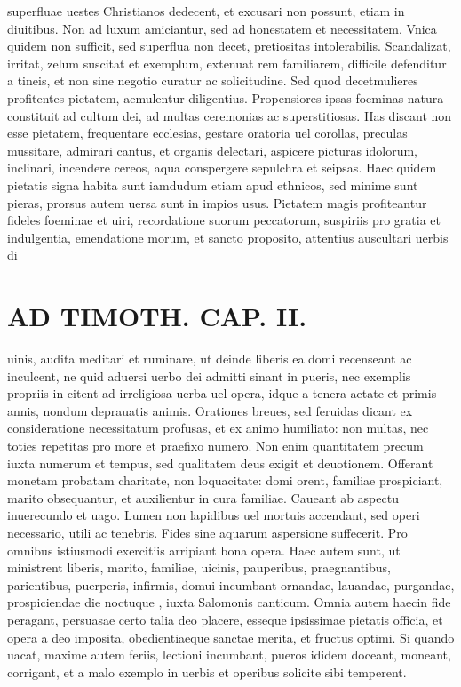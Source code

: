 \documentclass{article}
\begin{document}
\begin{pages}
superfluae uestes Christianos dedecent, et excusari non possunt, etiam in diuitibus. Non ad luxum amiciantur, sed ad honestatem et necessitatem. Vnica quidem non sufficit, sed superflua non decet, pretiositas intolerabilis. Scandalizat, irritat, zelum suscitat et exemplum, extenuat rem familiarem, difficile defenditur a tineis, et non sine negotio curatur ac solicitudine. Sed quod decetmulieres profitentes pietatem, aemulentur diligentius. Propensiores ipsas foeminas natura constituit ad cultum dei, ad multas ceremonias ac superstitiosas. Has discant non esse pietatem, frequentare ecclesias, gestare oratoria uel corollas, preculas mussitare, admirari cantus, et organis delectari, aspicere picturas idolorum, inclinari, incendere cereos, aqua conspergere sepulchra et seipsas. Haec quidem pietatis signa habita sunt iamdudum etiam apud ethnicos, sed minime sunt pieras, prorsus autem uersa sunt in impios usus. Pietatem magis profiteantur fideles foeminae et uiri, recordatione suorum peccatorum, suspiriis pro gratia et indulgentia, emendatione morum, et sancto proposito, attentius auscultari uerbis di\pend
\section*{AD TIMOTH. CAP. II. }
\marginpar{[ p.487 ]}\pstart uinis, audita meditari et ruminare, ut deinde liberis ea domi recenseant ac inculcent, ne quid aduersi uerbo dei admitti sinant in pueris, nec exemplis propriis in citent ad irreligiosa uerba uel opera, idque a tenera aetate et primis annis, nondum deprauatis animis. Orationes breues, sed feruidas dicant ex consideratione necessitatum profusas, et ex animo humiliato: non multas, nec toties repetitas pro more et praefixo numero. Non enim quantitatem precum iuxta numerum et tempus, sed qualitatem deus exigit et deuotionem. Offerant monetam probatam charitate, non loquacitate: domi orent, familiae prospiciant, marito obsequantur, et auxilientur in cura familiae. Caueant ab aspectu inuerecundo et uago. Lumen non lapidibus uel mortuis accendant, sed operi necessario, utili ac tenebris. Fides sine aquarum aspersione suffecerit. Pro omnibus istiusmodi exercitiis arripiant bona opera. Haec autem sunt, ut ministrent liberis, marito, familiae, uicinis, pauperibus, praegnantibus, parientibus, puerperis, infirmis, domui incumbant ornandae, lauandae, purgandae, prospiciendae die noctuque , iuxta Salomonis canticum. Omnia autem haecin fide peragant, persuasae certo talia deo placere, esseque ipsissimae pietatis officia, et opera a deo imposita, obedientiaeque sanctae merita, et fructus optimi. Si quando uacat, maxime autem feriis, lectioni incumbant, pueros ididem doceant, moneant, corrigant, et a malo exemplo in uerbis et operibus solicite sibi temperent.  \pend
{}
{}

\end{pages}
\end{document}
